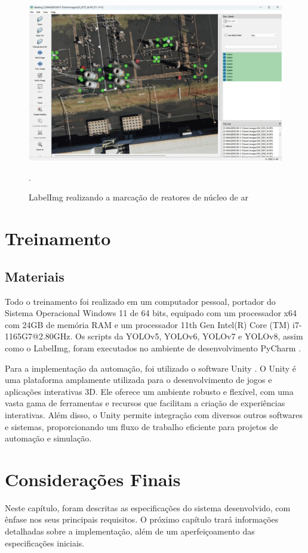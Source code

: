 \begin{figure}[!h]
    \centering
    \begin{minipage}{1\linewidth}
    \centering
    \captionsetup{justification=centering,margin=0.5cm,font=small}
    \includegraphics[width=1\linewidth]{img/cap4/marcacao.jpeg}
    \caption{LabelImg realizando a marcação de reatores de núcleo de ar}.
    \label{fig:reator-marcado}
    \end{minipage}
\end{figure}

\section{Treinamento}

\subsection{Materiais}

Todo o treinamento foi realizado em um computador pessoal, portador do Sistema Operacional Windows 11 de 64 bits, equipado com um processador x64 com 24GB de memória RAM e um processador 11th Gen Intel(R) Core (TM) i7-1165G7@2.80GHz. Os scripts da YOLOv5, YOLOv6, YOLOv7 e YOLOv8, assim como o LabelImg, foram executados no ambiente de desenvolvimento PyCharm \cite{pycharm}.

Para a implementação da automação, foi utilizado o software Unity \cite{unity}. O Unity é uma plataforma amplamente utilizada para o desenvolvimento de jogos e aplicações interativas 3D. Ele oferece um ambiente robusto e flexível, com uma vasta gama de ferramentas e recursos que facilitam a criação de experiências interativas. Além disso, o Unity permite integração com diversos outros softwares e sistemas, proporcionando um fluxo de trabalho eficiente para projetos de automação e simulação.

\section{Considerações Finais}

Neste capítulo, foram descritas as especificações do sistema desenvolvido, com ênfase nos seus principais requisitos. O próximo capítulo trará informações detalhadas sobre a implementação, além de um aperfeiçoamento das especificações iniciais.



